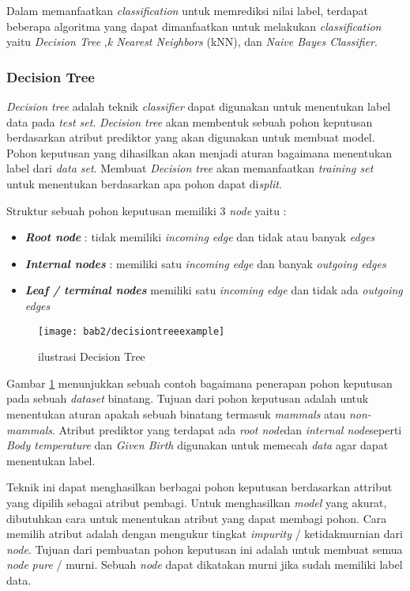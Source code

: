 Dalam memanfaatkan \textit{classification} untuk memrediksi nilai label, terdapat beberapa algoritma yang dapat dimanfaatkan untuk melakukan \textit{classification} yaitu \textit{Decision Tree} ,\textit{k Nearest Neighbors} (kNN), dan \textit{Naive Bayes Classifier}.

\subsubsection{Decision Tree} 
\textit{Decision tree} adalah teknik \textit{classifier} dapat digunakan untuk menentukan label data pada \textit{test set}. \textit{Decision tree} akan membentuk sebuah pohon keputusan berdasarkan atribut prediktor yang akan digunakan untuk membuat model. Pohon keputusan yang dihasilkan akan menjadi aturan bagaimana menentukan label dari \textit{data set}. Membuat \textit{Decision tree} akan memanfaatkan \textit{training set} untuk menentukan berdasarkan apa pohon dapat di\textit{split}. 

Struktur sebuah pohon keputusan memiliki 3 \textit{node} yaitu : 
\begin{itemize}
\item \textbf{\textit{Root node}} : tidak memiliki \textit{incoming edge} dan tidak atau banyak \textit{edges}
\item \textbf{\textit{Internal nodes}} : memiliki satu \textit{incoming edge} dan banyak \textit{outgoing edges} 
\item \textbf{\textit{Leaf / terminal nodes}} memiliki satu \textit{incoming edge} dan tidak ada \textit{outgoing edges}
\end{itemize}
\pagebreak
\begin{figure}[h!]
	\centering  
	\texttt{[image: bab2/decisiontreeexample]}   
	\label{fig:decisiontreeexample} 
	\caption{ilustrasi Decision Tree}
\end{figure} 

Gambar \ref{fig:decisiontreeexample} menunjukkan sebuah contoh bagaimana penerapan pohon keputusan pada sebuah \textit{dataset} binatang. Tujuan dari pohon keputusan adalah untuk menentukan aturan apakah sebuah binatang termasuk \textit{mammals} atau \textit{non-mammals}. Atribut prediktor yang terdapat ada \textit{root node}dan \textit{internal node}seperti \textit{Body temperature} dan \textit{Given Birth} digunakan untuk memecah \textit{data} agar dapat menentukan label. 


Teknik ini dapat menghasilkan berbagai pohon keputusan berdasarkan attribut yang dipilih sebagai atribut pembagi. Untuk menghasilkan \textit{model} yang akurat, dibutuhkan cara untuk menentukan atribut yang dapat membagi pohon. Cara memilih atribut adalah dengan mengukur tingkat \textit{impurity} / ketidakmurnian dari \textit{node}. Tujuan dari pembuatan pohon keputusan ini adalah untuk membuat semua \textit{node} \textit{pure} / murni. Sebuah \textit{node} dapat dikatakan murni jika sudah memiliki label data. 

